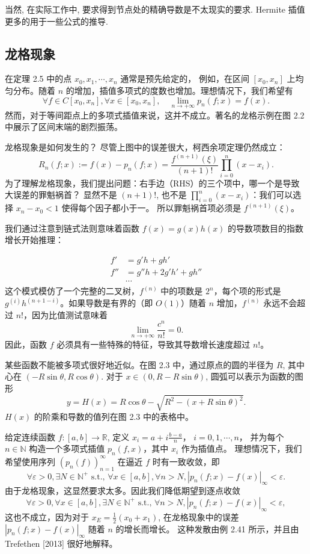 \documentclass[a4paper]{ctexart}
\begin{document}
当然, 在实际工作中, 要求得到节点处的精确导数是不太现实的要求. Hermite 插值
更多的用于一些公式的推导.

\subsection{龙格现象}

 在定理 2.5 中的点 $x_0 , x_1 , \cdots , x_n$ 通常是预先给定的，
例如，在区间 $[x_0 , x_n]$ 上均匀分布。随着 $n$ 的增加，插值多项式的度数也增加。理想情况下，我们希望有
\[
\forall f \in C[x_0, x_n], \forall x \in [x_0 , x_n], \quad \lim_{n \to +\infty} p_n (f ; x) = f (x).
\]
然而，对于等间距点上的多项式插值来说，这并不成立。著名的龙格示例在图 2.2 中展示了区间末端的剧烈振荡。

 龙格现象是如何发生的？
尽管上图中的误差很大，柯西余项定理仍然成立：
\[
R_n (f ; x) := f (x) - p_n (f ; x) = \frac{f^{(n+1)}(\xi)}{(n + 1)!} \prod_{i=0}^{n} (x - x_i).
\]
为了理解龙格现象，我们提出问题：右手边（RHS）的三个项中，哪一个是导致大误差的罪魁祸首？
显然不是 $(n + 1)!$, 也不是 $\prod_{i=0}^{n} (x - x_i)$：我们可以选择 $x_n - x_0 < 1$ 使得每个因子都小于一。
所以罪魁祸首项必须是 $f^{(n+1)}(\xi)$。

我们通过注意到链式法则意味着函数 $f(x) = g(x)h(x)$ 的导数项数目的指数增长开始推理：

\begin{align*}
f' &= g' h + gh' \\
f'' &= g'' h + 2g' h' + gh'' \\
&\cdots
\end{align*}
这个模式模仿了一个完整的二叉树，$f^{(n)}$ 中的项数是 $2^n$，每个项的形式是 $g^{(i)} h^{(n+1-i)}$。如果导数是有界的（即 $O(1)$）随着 $n$ 增加，$f^{(n)}$ 永远不会超过 $n!$，因为比值测试意味着
\[
\lim_{n \to +\infty} \frac{c^n}{n!} = 0.
\]
因此，函数 $f$ 必须具有一些特殊的特征，导致其导数增长速度超过 $n!$。

 某些函数不能被多项式很好地近似。在图 2.3 中，通过原点的圆的半径为 $R$, 
其中心在 $(-R \sin \theta, R \cos \theta)$. 对于 $x \in (0, R - R \sin \theta)$, 圆弧可以表示为函数的图形
\[
y = H(x) = R \cos \theta - \sqrt{R^2 - (x + R \sin \theta)^2}.
\]
$H(x)$ 的阶乘和导数的值列在图 2.3 中的表格中。

 给定连续函数 $f : [a, b] \rightarrow \mathbb{R}$, 
定义 $x_i = a + i\frac{b-a}{n}$， $i = 0, 1, \cdots , n$， 并为每个 $n \in \mathbb{N}$ 构造一个多项式插值 $p_n(f, x)$，其中 $x_i$ 作为插值点。
理想情况下，我们希望使用序列 $(p_n(f))_{n=1}^{\infty}$ 在逼近 $f$ 时有一致收敛，即
\[
\forall \varepsilon > 0, \exists N \in \mathbb{N}^+ \text{ s.t., } \forall x \in [a, b], \forall n > N, |p_n(f ; x) - f (x)|_{\infty} < \varepsilon.
\]
由于龙格现象，这显然要求太多。因此我们降低期望到逐点收敛
\[
\forall \varepsilon > 0, \forall x \in [a, b], \exists N \in \mathbb{N}^+ \text{ s.t., } \forall n > N, |p_n(f ; x) - f (x)|_{\infty} < \varepsilon,
\]
这也不成立，因为对于 $x_E = \frac{1}{2}(x_0 + x_1)$, 在龙格现象中的误差 $|p_n(f ; x) - f (x)|_{\infty}$ 随着 $n$ 的增长而增长。
这种发散由例 2.41 所示，并且由 Trefethen [2013] 很好地解释。
\end{document}
